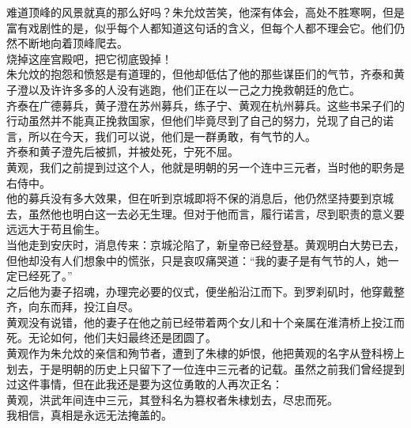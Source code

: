 \begin{multicols}{\theparacolNo}
难道顶峰的风景就真的那么好吗？朱允炆苦笑，他深有体会，高处不胜寒啊，但是富有戏剧性的是，似乎每个人都知道这句话的含义，但每个人都不理会它。他们仍然不断地向着顶峰爬去。\\

烧掉这座宫殿吧，把它彻底毁掉！\\

朱允炆的抱怨和愤怒是有道理的，但他却低估了他的那些谋臣们的气节，齐泰和黄子澄以及许许多多的人没有逃跑，他们正在以一己之力挽救朝廷的危亡。\\

齐泰在广德募兵，黄子澄在苏州募兵，练子宁、黄观在杭州募兵。这些书呆子们的行动虽然并不能真正挽救国家，但他们毕竟尽到了自己的努力，兑现了自己的诺言，所以在今天，我们可以说，他们是一群勇敢，有气节的人。\\

齐泰和黄子澄先后被抓，并被处死，宁死不屈。\\

黄观，我们之前提到过这个人，他就是明朝的另一个连中三元者，当时他的职务是右侍中。\\

他的募兵没有多大效果，但在听到京城即将不保的消息后，他仍然坚持要到京城去，虽然他也明白这一去必无生理。但对于他而言，履行诺言，尽到职责的意义要远远大于苟且偷生。\\

当他走到安庆时，消息传来：京城沦陷了，新皇帝已经登基。黄观明白大势已去，但他却没有人们想象中的慌张，只是哀叹痛哭道：“我的妻子是有气节的人，她一定已经死了。”\\

之后他为妻子招魂，办理完必要的仪式，便坐船沿江而下。到罗刹矶时，他穿戴整齐，向东而拜，投江自尽。\\

黄观没有说错，他的妻子在他之前已经带着两个女儿和十个亲属在淮清桥上投江而死。无论如何，他们夫妇最终还是团圆了。\\

黄观作为朱允炆的亲信和殉节者，遭到了朱棣的妒恨，他把黄观的名字从登科榜上划去，于是明朝的历史上只留下了一位连中三元者的记载。虽然之前我们曾经提到过这件事情，但在此我还是要为这位勇敢的人再次正名：\\

黄观，洪武年间连中三元，其登科名为篡权者朱棣划去，尽忠而死。\\

我相信，真相是永远无法掩盖的。\\


\end{multicols}

